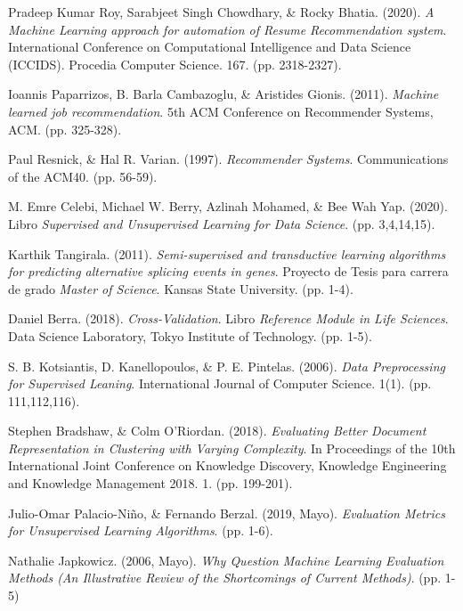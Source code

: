 \documentclass[12pt,a4paper]{article}
\begin{document}
\begin{sloppypar}
\begin{thebibliography}{9}
Pradeep Kumar Roy, Sarabjeet Singh Chowdhary, \& Rocky Bhatia. (2020). \textit{A Machine Learning approach for automation of Resume Recommendation system}. International Conference on Computational Intelligence and Data Science (ICCIDS). Procedia Computer Science. 167. (pp. 2318-2327).

Ioannis Paparrizos, B. Barla Cambazoglu, \& Aristides Gionis. (2011). \textit{Machine learned job recommendation}. 5th ACM Conference on Recommender Systems, ACM. (pp. 325-328).

Paul Resnick, \& Hal R. Varian. (1997). \textit{Recommender Systems}. Communications of the ACM40. (pp. 56-59).

M. Emre Celebi, Michael W. Berry, Azlinah Mohamed, \& Bee Wah Yap. (2020). Libro \textit{Supervised and Unsupervised Learning for Data Science}. (pp. 3,4,14,15).

Karthik Tangirala. (2011). \textit{Semi-supervised and transductive learning algorithms for predicting alternative splicing events in genes}. Proyecto de Tesis para carrera de grado \textit{Master of Science}. Kansas State University. (pp. 1-4).

Daniel Berra. (2018). \textit{Cross-Validation}. Libro \textit{Reference Module in Life Sciences}. Data Science Laboratory, Tokyo Institute of Technology. (pp. 1-5).

S. B. Kotsiantis, D. Kanellopoulos, \& P. E. Pintelas. (2006). \textit{Data Preprocessing for Supervised Leaning}. International Journal of Computer Science. 1(1). (pp. 111,112,116). 

Stephen Bradshaw, \& Colm O’Riordan. (2018). \textit{Evaluating Better Document Representation in Clustering with Varying Complexity}. In Proceedings of the 10th International Joint Conference on Knowledge Discovery, Knowledge Engineering and Knowledge Management 2018. 1. (pp. 199-201).

Julio-Omar Palacio-Niño, \& Fernando Berzal. (2019, Mayo). \textit{Evaluation Metrics for Unsupervised Learning Algorithms}. (pp. 1-6).

Nathalie Japkowicz. (2006, Mayo). \textit{Why Question Machine Learning Evaluation Methods (An Illustrative Review of the Shortcomings of Current Methods)}. (pp. 1-5)


\end{thebibliography}
\end{sloppypar}
\end{document}
